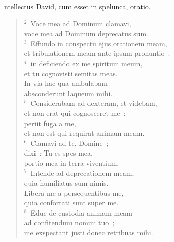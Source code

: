 \bchapter
{}ntellectus David, cum esset in spelunca, oratio.
\begin{flushleft}\begin{verse}\vspace{6pt}${}^{2}$~Voce mea ad Dominum clamavi,\\ voce mea ad Dominum deprecatus sum.\\
${}^{3}$~Effundo in conspectu ejus orationem meam,\\ et tribulationem meam ante ipsum pronuntio~:\\
${}^{4}$~in deficiendo ex me spiritum meum,\\ et tu cognovisti semitas meas.\\ In via hac qua ambulabam\\ absconderunt laqueum mihi.\\
${}^{5}$~Considerabam ad dexteram, et videbam,\\ et non erat qui cognosceret me~:\\ periit fuga a me,\\ et non est qui requirat animam meam.\\
${}^{6}$~Clamavi ad te, Domine~;\\ dixi~: Tu es spes mea,\\ portio mea in terra viventium.\\
${}^{7}$~Intende ad deprecationem meam,\\ quia humiliatus sum nimis.\\ Libera me a persequentibus me,\\ quia confortati sunt super me.\\
${}^{8}$~Educ de custodia animam meam\\ ad confitendum nomini tuo~;\\ me exspectant justi donec retribuas mihi.\end{verse}\end{flushleft}



